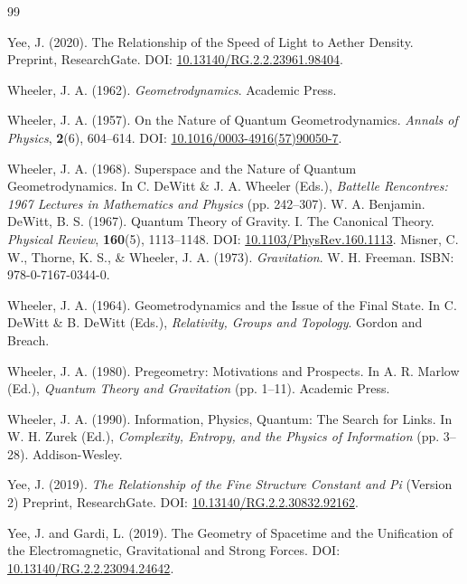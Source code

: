 \documentclass[10pt,a4paper]{article}
\begin{document}
\begin{thebibliography}{99}
	
	Yee, J. (2020). The Relationship of the Speed of Light to Aether Density.
	Preprint, ResearchGate.
	DOI: \href{https://doi.org/10.13140/RG.2.2.23961.98404}{10.13140/RG.2.2.23961.98404}.
	
Wheeler, J. A. (1962).
\textit{Geometrodynamics}.
Academic Press.

Wheeler, J. A. (1957).
On the Nature of Quantum Geometrodynamics.
\textit{Annals of Physics}, \textbf{2}(6), 604–614.
DOI: \href{https://doi.org/10.1016/0003-4916(57)90050-7}{10.1016/0003-4916(57)90050-7}.

Wheeler, J. A. (1968).
Superspace and the Nature of Quantum Geometrodynamics.
In C. DeWitt \& J. A. Wheeler (Eds.), \textit{Battelle Rencontres: 1967 Lectures in Mathematics and Physics} (pp. 242–307).
W. A. Benjamin.
DeWitt, B. S. (1967).
Quantum Theory of Gravity. I. The Canonical Theory.
\textit{Physical Review}, \textbf{160}(5), 1113–1148.
DOI: \href{https://doi.org/10.1103/PhysRev.160.1113}{10.1103/PhysRev.160.1113}.
Misner, C. W., Thorne, K. S., \& Wheeler, J. A. (1973).
\textit{Gravitation}.
W. H. Freeman.
ISBN: 978-0-7167-0344-0.

Wheeler, J. A. (1964).
Geometrodynamics and the Issue of the Final State.
In C. DeWitt \& B. DeWitt (Eds.), \textit{Relativity, Groups and Topology}.
Gordon and Breach.

Wheeler, J. A. (1980).
Pregeometry: Motivations and Prospects.
In A. R. Marlow (Ed.), \textit{Quantum Theory and Gravitation} (pp. 1–11).
Academic Press.

Wheeler, J. A. (1990).
Information, Physics, Quantum: The Search for Links.
In W. H. Zurek (Ed.), \textit{Complexity, Entropy, and the Physics of Information} (pp. 3–28).
Addison-Wesley.

	
	 Yee, J. (2019). \textit{The Relationship of the Fine Structure Constant and Pi} (Version 2)
	Preprint, ResearchGate.
	DOI:
	\href{https://doi.org/10.13140/RG.2.2.30832.92162}{10.13140/RG.2.2.30832.92162}.
	
	Yee, J. and Gardi, L. (2019).
	The Geometry of Spacetime and the Unification of the Electromagnetic, Gravitational and Strong Forces.
	DOI: \href{https://doi.org/10.13140/RG.2.2.23094.24642}{10.13140/RG.2.2.23094.24642}.
	

\end{thebibliography}
\end{document}
